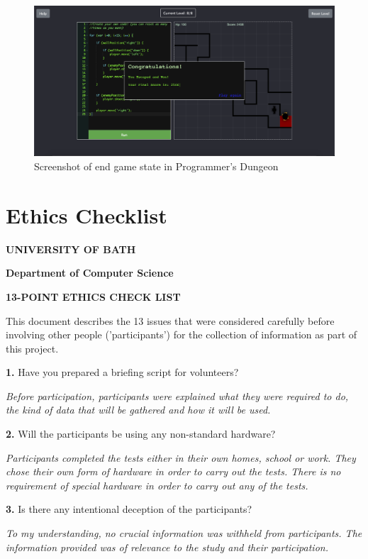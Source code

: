 \documentclass[a4paper,11.5pt]{report}
\numberwithin{figure}{section}
\numberwithin{table}{section}
\numberwithin{equation}{section}
\numberwithin{equation}{section}
\begin{document}
\begin{figure}[H]
 \centering
    \includegraphics[width=1\textwidth]{endgame}
       \captionsetup{justification=centering}
\caption{Screenshot of end game state in Programmer's Dungeon}
\label{fig:endgame}
\end{figure}



\chapter{Ethics Checklist} \label{app:ethicschecklist}

\textbf{UNIVERSITY OF BATH}

\textbf{Department of Computer Science}

\textbf{13-POINT ETHICS CHECK LIST}

This document describes the 13 issues that were considered carefully before involving other people ('participants') for the collection of information as part of this project.

\textbf{1.}	Have you prepared a briefing script for volunteers?
	
\textit{Before participation, participants were explained what they were required to do, the kind of data that will be gathered and how it will be used.}
	
\textbf{2.}	Will the participants be using any non-standard hardware? 

\textit{Participants completed the tests either in their own homes, school or work. They chose their own form of hardware in order to carry out the tests. There is no requirement of special hardware in order to carry out any of the tests.}

\textbf{3.}	Is there any intentional deception of the participants?  

\textit{To my understanding, no crucial information was withheld from participants. The information provided was of relevance to the study and their participation.}
\end{document}
